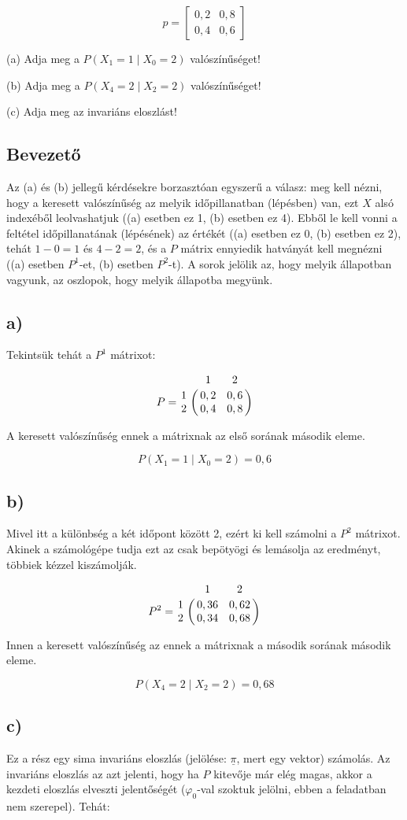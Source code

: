\documentclass[a4paper,12pt]{article}
\begin{document}
\[
p = 
\begin{bmatrix} 
0,2    &    0,8 \\
0,4    &    0,6
\end{bmatrix}
\]

(a) Adja meg a $P(X_1 = 1 \mid X_0 = 2)$ valószínűséget!

(b) Adja meg a $P(X_4 = 2 \mid X_2 = 2)$ valószínűséget!

(c) Adja meg az invariáns eloszlást!

\subsection*{Bevezető}
Az (a) és (b) jellegű kérdésekre borzasztóan egyszerű a válasz:
meg kell nézni, hogy a keresett valószínűség az  melyik időpillanatban 
(lépésben) van, ezt $X$ alsó indexéből leolvashatjuk ((a) esetben ez 1,
(b) esetben ez 4). 
Ebből le kell vonni a feltétel időpillanatának (lépésének) az értékét 
((a) esetben ez 0, (b) esetben ez 2), tehát $1-0=1$ és $4-2=2$, és a 
$P$ mátrix ennyiedik hatványát kell megnézni
((a) esetben $P^1$-et, (b) esetben $P^2$-t). A sorok jelölik az, hogy 
melyik állapotban vagyunk, az oszlopok, hogy melyik állapotba megyünk.

\subsection*{a)}
Tekintsük tehát a $P^1$ mátrixot:

\[
P = 
\bordermatrix{
~	&	1	&	2	\cr
1	&	0,2	&	0,6	\cr
2	&	0,4	&	0,8}
\]

A keresett valószínűség ennek a mátrixnak az első sorának második eleme.

\[
P(X_1 = 1 \mid X_0 = 2) = 0,6
\]

\subsection*{b)}
Mivel itt a különbség a két időpont között 2, ezért ki kell számolni a 
$P^2$ mátrixot. Akinek a számológépe tudja ezt az csak bepötyögi és 
lemásolja az eredményt,  többiek kézzel kiszámolják.

\[
P^2 = 
\bordermatrix{
~	&	1	    &	2    	\cr
1	&	0,36	&	0,62	\cr
2	&	0,34	&	0,68}
\]

Innen a keresett valószínűség az ennek a mátrixnak a második sorának
második eleme.

\[
P(X_4 = 2 \mid X_2 = 2) = 0,68
\]

\subsection*{c)}
Ez a rész egy sima invariáns eloszlás (jelölése: $\underline{\pi}$, 
mert egy vektor) számolás. Az invariáns eloszlás 
az azt jelenti, hogy ha $P$ kitevője már elég magas, akkor a kezdeti
eloszlás elveszti jelentőségét ($\varphi_0$-val szoktuk jelölni, ebben a
feladatban nem szerepel). Tehát:
\end{document}
